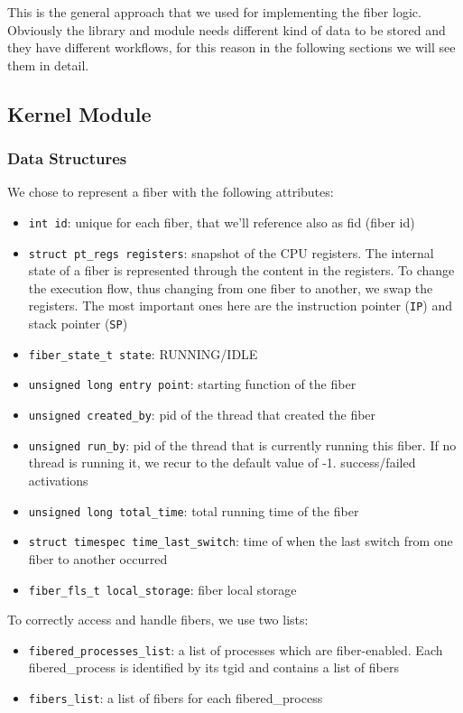 \documentclass[a4paper,10pt]{article}
\begin{document}
This is the general approach that we used for implementing the fiber logic. Obviously the library and module needs different kind of data to be stored and they have different workflows, for this reason in the following sections we will see them in detail.

\subsection{Kernel Module}
\subsubsection{Data Structures}\label{subsubsec:kern-datas}
We chose to represent a fiber with the following attributes:
\begin{itemize}
	\item \lstinline{int id}: unique for each fiber, that we’ll reference also as fid (fiber id)
	\item \lstinline{struct pt_regs registers}: snapshot of the CPU registers. The internal state of a fiber is represented through the content in the registers. To change the execution flow, thus changing from one fiber to another, we swap the registers. The most important ones here are the instruction pointer (\texttt{IP}) and stack pointer (\texttt{SP})
	\item \lstinline{fiber_state_t state}: RUNNING/IDLE
	\item \lstinline{unsigned long entry point}: starting function of the fiber
	\item \lstinline{unsigned created_by}: pid of the thread that created the fiber
	\item \lstinline{unsigned run_by}: pid of the thread that is currently running this fiber. If no thread is running it, we recur to the default value of -1.
	      success/failed activations
	\item \lstinline{unsigned long total_time}: total running time of the fiber
	\item \lstinline{struct timespec time_last_switch}: time of when the last switch from one fiber to another occurred
	\item \lstinline{fiber_fls_t local_storage}: fiber local storage
\end{itemize}

To correctly access and handle fibers, we use two lists:
\begin{itemize}
	\item \lstinline{fibered_processes_list}: a list of processes which are fiber-enabled. Each fibered\_process is identified by its tgid and contains a list of fibers
	\item \lstinline{fibers_list}: a list of fibers for each fibered\_process
\end{itemize}
\end{document}
